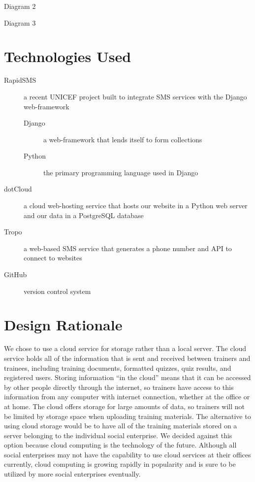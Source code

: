 Diagram 2

Diagram 3

\section{Technologies Used}
\begin{description}
	\item[RapidSMS] a recent UNICEF project built to integrate SMS services with the Django web-framework
	\begin{description}
		\item[Django] a web-framework that lends itself to form collections
		\item[Python] the primary programming language used in Django
	\end{description}
	\item[dotCloud] a cloud web-hosting service that hosts our website in a Python web server and our data in a PostgreSQL database
	\item[Tropo] a web-based SMS service that generates a phone number and API to connect to websites
	\item[GitHub] version control system
\end{description}

\section{Design Rationale}

We chose to use a cloud service for storage rather than a local server. The cloud service holds all of the information that is sent and received between trainers and trainees, including training documents, formatted quizzes, quiz results, and registered users. Storing information “in the cloud” means that it can be accessed by other people directly through the internet, so trainers have access to this information from any computer with internet connection, whether at the office or at home. The cloud offers storage for large amounts of data, so trainers will not be limited by storage space when uploading training materials. The alternative to using cloud storage would be to have all of the training materials stored on a server belonging to the individual social enterprise. We decided against this option because cloud computing is the technology of the future. Although all social enterprises may not have the capability to use cloud services at their offices currently, cloud computing is growing rapidly in popularity and is sure to be utilized by more social enterprises eventually.

